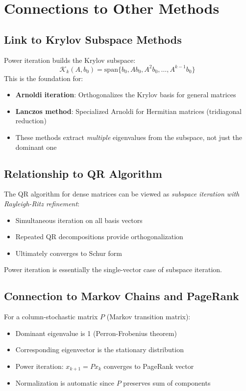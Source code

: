 \documentclass[11pt]{article}
\begin{document}
\section{Connections to Other Methods}

\subsection{Link to Krylov Subspace Methods}
Power iteration builds the Krylov subspace:
\[
\mathcal{K}_k(A, b_0) = \text{span}\{b_0, A b_0, A^2 b_0, \dots, A^{k-1} b_0\}
\]
This is the foundation for:
\begin{itemize}
\item \textbf{Arnoldi iteration}: Orthogonalizes the Krylov basis for general matrices
\item \textbf{Lanczos method}: Specialized Arnoldi for Hermitian matrices (tridiagonal reduction)
\item These methods extract \emph{multiple} eigenvalues from the subspace, not just the dominant one
\end{itemize}

\subsection{Relationship to QR Algorithm}
The QR algorithm for dense matrices can be viewed as \emph{subspace iteration with Rayleigh-Ritz refinement}:
\begin{itemize}
\item Simultaneous iteration on all basis vectors
\item Repeated QR decompositions provide orthogonalization
\item Ultimately converges to Schur form
\end{itemize}
Power iteration is essentially the single-vector case of subspace iteration.

\subsection{Connection to Markov Chains and PageRank}
For a column-stochastic matrix $P$ (Markov transition matrix):
\begin{itemize}
\item Dominant eigenvalue is 1 (Perron-Frobenius theorem)
\item Corresponding eigenvector is the stationary distribution
\item Power iteration: $x_{k+1} = P x_k$ converges to PageRank vector
\item Normalization is automatic since $P$ preserves sum of components
\end{itemize}
\end{document}
